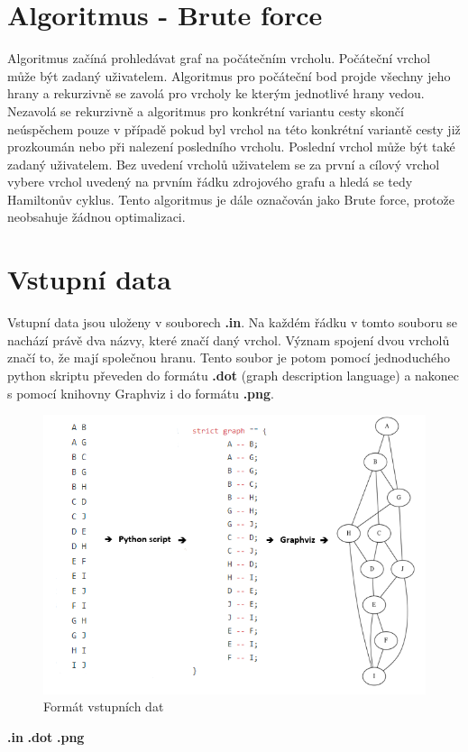 \documentclass[a4paper,11pt]{article}
\begin{document}
\section{Algoritmus - Brute force}

Algoritmus začíná prohledávat graf na počátečním vrcholu. Počáteční vrchol může být zadaný uživatelem. Algoritmus pro počáteční bod projde všechny jeho hrany a rekurzivně se zavolá pro vrcholy ke kterým jednotlivé hrany vedou. Nezavolá se rekurzivně a algoritmus pro konkrétní variantu cesty skončí neúspěchem pouze v případě pokud byl vrchol na této konkrétní variantě cesty již prozkoumán nebo při nalezení posledního vrcholu. Poslední vrchol může být také zadaný uživatelem. Bez uvedení vrcholů uživatelem se za první a cílový vrchol vybere vrchol uvedený na prvním řádku zdrojového grafu a hledá se tedy Hamiltonův cyklus. Tento algoritmus je dále označován jako Brute force, protože neobsahuje žádnou optimalizaci.

\section{Vstupní data}

Vstupní data jsou uloženy v souborech \textbf{.in}. Na každém řádku v tomto souboru se nachází právě dva názvy, které značí daný vrchol. Význam spojení dvou vrcholů značí to, že mají společnou hranu. Tento soubor je potom pomocí jednoduchého python skriptu převeden do formátu \textbf{.dot} (graph description language) a nakonec s pomocí knihovny Graphviz\cite{graphviz} i do formátu \textbf{.png}.

\newpage

\begin{figure}[!h]
\caption{Formát vstupních dat}
\includegraphics[]{./inputData.png}
\centering
\end{figure}
\hspace{0,55cm}\textbf{\LARGE{.in}} \hspace{6cm} \textbf{\LARGE{.dot}} \hspace{4,6cm} \textbf{\LARGE{.png}}
\end{document}

